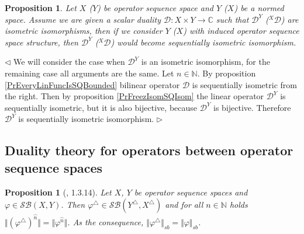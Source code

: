 \documentclass[12pt]{article}
\newtheorem{proposition}[theorem]{Proposition}
\newenvironment{proof}{\par $\triangleleft$}{$\triangleright$}
\begin{document}
\begin{proposition}\label{PrFreezDualityGetSQIsom}
Let $X$ ($Y$) be operator sequence space and $Y$ ($X$) be a normed space. Assume we are given a scalar duality $\mathcal{D}:X\times Y\to\mathbb{C}$ such that $\mathcal{D}^Y$ (${}^X\mathcal{D}$) 
are isometric isomorphisms, then if we consider $Y$ ($X$) with induced operator sequence space structure, then $\mathcal{D}^Y$ (${}^X\mathcal{D}$) would become sequentially isometric isomorphism.
\end{proposition}
\begin{proof}
We will consider the case when $\mathcal{D}^Y$ is an isometric isomorphism, for the remaining case all arguments are the same. Let $n\in\mathbb{N}$. By proposition \ref{PrEveryLinFuncIsSQBounded} bilinear operator $\mathcal{D}$ is sequentially isometric from the right. Then by proposition \ref{PrFreezIsomSQIsom} the linear operator $\mathcal{D}^Y$ is sequentially isometric, but it is also bijective, because $\mathcal{D}^Y$ is bijective. Therefore $\mathcal{D}^Y$ is sequentially isometric isomorphism. 
\end{proof}































\subsection{Duality theory for operators between operator sequence spaces}

\begin{proposition}[\cite{LamOpFolgen}, 1.3.14]\label{PrDualSBOp}
Let $X$, $Y$ be operator sequence spaces and $\varphi\in \mathcal{SB}(X,Y)$. Then $\varphi^\triangle \in\mathcal{SB}(Y^\triangle ,X^\triangle )$ and for all $n\in\mathbb{N}$ holds 
$\Vert(\varphi^\triangle )^{\wideparen{n}}\Vert=\Vert\varphi^{\wideparen{n}}\Vert$. As the consequence, $\Vert\varphi^\triangle \Vert_{sb}=\Vert\varphi\Vert_{sb}$.
\end{proposition}
\end{document}
